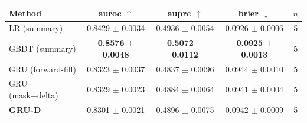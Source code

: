\begin{tabular}{lcccc}
\toprule
Method & auroc $\uparrow$ & auprc $\uparrow$ & brier $\downarrow$ & $n$ \\
\midrule
LR (summary) & \underline{0.8429 $\pm$ 0.0034} & \underline{0.4936 $\pm$ 0.0054} & \underline{0.0926 $\pm$ 0.0006} & 5 \\
GBDT (summary) & \textbf{0.8576 $\pm$ 0.0048} & \textbf{0.5072 $\pm$ 0.0112} & \textbf{0.0925 $\pm$ 0.0013} & 5 \\
GRU (forward-fill) & 0.8323 $\pm$ 0.0037 & 0.4837 $\pm$ 0.0096 & 0.0944 $\pm$ 0.0010 & 5 \\
GRU (mask+delta) & 0.8329 $\pm$ 0.0023 & 0.4884 $\pm$ 0.0064 & 0.0941 $\pm$ 0.0004 & 5 \\
\textbf{GRU-D} & 0.8301 $\pm$ 0.0021 & 0.4896 $\pm$ 0.0075 & 0.0942 $\pm$ 0.0009 & 5 \\
\bottomrule
\end{tabular}
